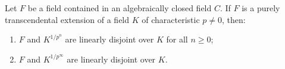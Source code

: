 Let $F$ be a field contained in an algebraically closed field $C$.
If $F$ is a purely transcendental extension of a field $K$ of characteristic $p \neq 0$, then:
\begin{enumerate}
\item[(i)] $F$ and $K^{1/p^n}$ are linearly disjoint over $K$ for all $n \geq 0$;
\item[(ii)] $F$ and $K^{1/p^\infty}$ are linearly disjoint over $K$.
\end{enumerate}
